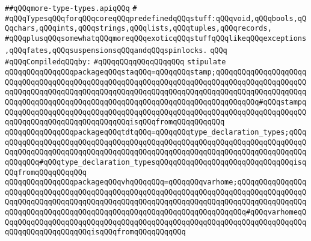 \label{src/lib/compiler/front/typer/types/more-type-types.api}
\verb|##qQQqmore-type-types.apiqQQq|\newline
\verb|#|\newline
\verb|#qQQqTypesqQQqforqQQqcoreqQQqpredefinedqQQqstuff:qQQqvoid,qQQqbools,qQQqchars,qQQqints,qQQqstrings,qQQqlists,qQQqtuples,qQQqrecords,|\newline
\verb|#qQQqplusqQQqsomewhatqQQqmoreqQQqexoticqQQqstuffqQQqlikeqQQqexceptions,qQQqfates,qQQqsuspensionsqQQqandqQQqspinlocks.|\newline
\verb|qQQq|\newline
\verb|#qQQqCompiledqQQqby:|\newline
\verb|#qQQqqQQqqQQqqQQqqQQq|\newline
\newline
\verb|stipulate|\newline
\verb|qQQqqQQqqQQqqQQqpackageqQQqstaqQQq=qQQqqQQqstamp;qQQqqQQqqQQqqQQqqQQqqQQqqQQqqQQqqQQqqQQqqQQqqQQqqQQqqQQqqQQqqQQqqQQqqQQqqQQqqQQqqQQqqQQqqQQqqQQqqQQqqQQqqQQqqQQqqQQqqQQqqQQqqQQqqQQqqQQqqQQqqQQqqQQqqQQqqQQqqQQqqQQqqQQqqQQqqQQqqQQqqQQqqQQqqQQqqQQqqQQqqQQqqQQqqQQqqQQqqQQq#qQQqstampqQQqqQQqqQQqqQQqqQQqqQQqqQQqqQQqqQQqqQQqqQQqqQQqqQQqqQQqqQQqqQQqqQQqqQQqqQQqqQQqqQQqqQQqqQQqqQQqqQQqisqQQqfromqQQqqQQqqQQq|\newline
\verb|qQQqqQQqqQQqqQQqpackageqQQqtdtqQQq=qQQqqQQqtype_declaration_types;qQQqqQQqqQQqqQQqqQQqqQQqqQQqqQQqqQQqqQQqqQQqqQQqqQQqqQQqqQQqqQQqqQQqqQQqqQQqqQQqqQQqqQQqqQQqqQQqqQQqqQQqqQQqqQQqqQQqqQQqqQQqqQQqqQQqqQQqqQQqqQQqqQQqqQQq#qQQqtype_declaration_typesqQQqqQQqqQQqqQQqqQQqqQQqqQQqqQQqisqQQqfromqQQqqQQqqQQq|\newline
\verb|qQQqqQQqqQQqqQQqpackageqQQqvhqQQqqQQq=qQQqqQQqvarhome;qQQqqQQqqQQqqQQqqQQqqQQqqQQqqQQqqQQqqQQqqQQqqQQqqQQqqQQqqQQqqQQqqQQqqQQqqQQqqQQqqQQqqQQqqQQqqQQqqQQqqQQqqQQqqQQqqQQqqQQqqQQqqQQqqQQqqQQqqQQqqQQqqQQqqQQqqQQqqQQqqQQqqQQqqQQqqQQqqQQqqQQqqQQqqQQqqQQqqQQqqQQqqQQqqQQq#qQQqvarhomeqQQqqQQqqQQqqQQqqQQqqQQqqQQqqQQqqQQqqQQqqQQqqQQqqQQqqQQqqQQqqQQqqQQqqQQqqQQqqQQqqQQqqQQqqQQqisqQQqfromqQQqqQQqqQQq|\newline
